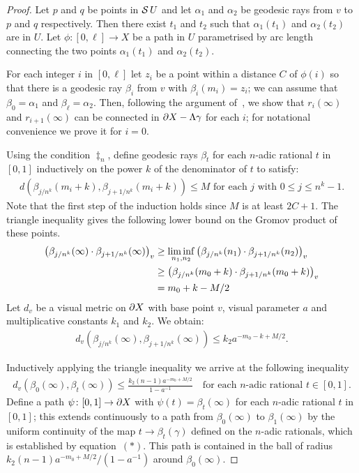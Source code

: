 \begin{proof} Let $p$ and $q$ be points in $\shadow U$ and let $\alpha_1$ and
$\alpha_2$ be geodesic rays from $v$ to $p$ and $q$ respectively. Then there
exist $t_1$ and $t_2$ such that $\alpha_1(t_1)$ and $\alpha_2(t_2)$ are in
$U$. Let $\phi\colon [0,\ell] \to X$ be a path in $U$ parametrised by arc
length connecting the two points $\alpha_1(t_1)$ and $\alpha_2(t_2)$.

For each integer $i$ in $[0,\ell]$ let $z_i$ be a point within a distance $C$
of $\phi(i)$ so that there is a geodesic ray $\beta_i$ from $v$ with
$\beta_i(m_i) = z_i$; we can assume that $\beta_0 = \alpha_1$ and $\beta_\ell =
\alpha_2$.  Then, following the argument of~\cite[Prop.\ 3.2]{bestvinamess91},
we show that $r_i(\infty)$ and $r_{i+1}(\infty)$ can be connected in $\boundary
X - \Lambda\gamma$ for each $i$; for notational convenience we prove it for
$i=0$.

Using the condition $\ddag_n$, define geodesic rays $\beta_t$ for each
$n$-adic rational $t$ in $[0, 1]$ inductively on the power $k$ of the
denominator of $t$ to satisfy:
\begin{align*} 
  d\left(\beta_{j/n^k}(m_i + k), \beta_{j+1/n^k}(m_i + k)\right) \leq M 
  \text{ for each $j$ with $0 \leq j \leq n^k-1$}.
\end{align*}
Note that the first step of the induction holds since $M$ is at least $2C+1$.
The triangle inequality gives the following lower bound on the Gromov product
of these points.
\begin{align*}
  \gromprod[v]{\beta_{j/n^k}(\infty)}{\beta_{j+1/n^k}(\infty)} & \geq
\liminf_{n_1,n_2}\gromprod[v]{\beta_{j/n^k}(n_1)}{\beta_{j+1/n^k}(n_2)}\\
& \geq \gromprod[v]{\beta_{j/n^k}(m_0 + k)}{\beta_{j+1/n^k}(m_0 + k)}\\
& = m_0 + k - M/2
\end{align*}
Let $d_v$ be a visual metric on $\boundary X$ with base point $v$, visual
parameter $a$ and multiplicative constants $k_1$ and $k_2$. We obtain:
\begin{align*}
  d_v\left(\beta_{j/n^k}(\infty), \beta_{j+1/n^k}(\infty)\right) \leq k_2a^{-m_0 - k + M/2}.\tag{*}
\end{align*}

Inductively applying the triangle inequality we arrive at the following inequality
\begin{align*}
  d_v\left(\beta_0(\infty), \beta_t(\infty)\right) \leq \frac{k_2(n-1)a^{-m_0 +
  M/2}}{1-a^{-1}}\quad\text{for each $n$-adic rational $t \in [0, 1]$.}
\end{align*}
Define a path $\psi \colon [0,1] \to \boundary X$ with $\psi(t) =
\beta_t(\infty)$ for each $n$-adic rational $t$ in $[0, 1]$; this extends
continuously to a path from $\beta_0(\infty)$ to $\beta_1(\infty)$ by the
uniform continuity of the map $t \to \beta_t(\gamma)$ defined on the $n$-adic
rationals, which is established by equation~$(*)$. This path is
contained in the ball of radius $k_2(n-1)a^{-m_0 + M/2}/(1-a^{-1})$ around
$\beta_0(\infty)$.


\end{proof}
